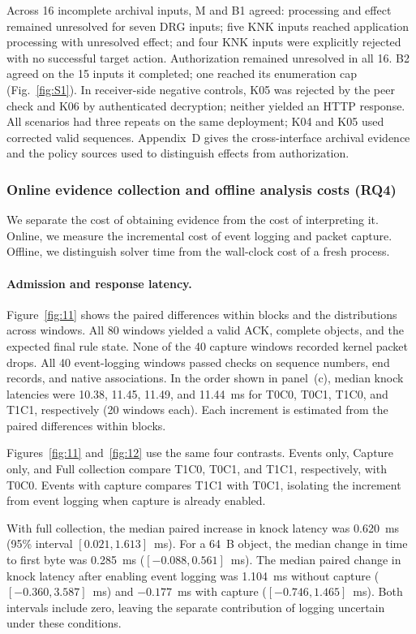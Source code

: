 Across 16 incomplete archival inputs, M and B1 agreed: processing and effect remained unresolved for seven DRG inputs; five KNK inputs reached application processing with unresolved effect; and four KNK inputs were explicitly rejected with no successful target action. Authorization remained unresolved in all 16. B2 agreed on the 15 inputs it completed; one reached its enumeration cap (Fig.~\ref{fig:S1}). In receiver-side negative controls, K05 was rejected by the peer check and K06 by authenticated decryption; neither yielded an HTTP response. All scenarios had three repeats on the same deployment; K04 and K05 used corrected valid sequences. Appendix~D gives the cross-interface archival evidence and the policy sources used to distinguish effects from authorization.

\subsubsection{Online evidence collection and offline analysis costs (RQ4)}\label{sec:cost}
We separate the cost of obtaining evidence from the cost of interpreting it. Online, we measure the incremental cost of event logging and packet capture. Offline, we distinguish solver time from the wall-clock cost of a fresh process.

\paragraph{Admission and response latency.} Figure~\ref{fig:11} shows the paired differences within blocks and the distributions across windows. All 80 windows yielded a valid ACK, complete objects, and the expected final rule state. None of the 40 capture windows recorded kernel packet drops. All 40 event-logging windows passed checks on sequence numbers, end records, and native associations. In the order shown in panel~(c), median knock latencies were 10.38, 11.45, 11.49, and 11.44~ms for T0C0, T0C1, T1C0, and T1C1, respectively (20 windows each). Each increment is estimated from the paired differences within blocks.

Figures~\ref{fig:11} and~\ref{fig:12} use the same four contrasts. Events only, Capture only, and Full collection compare T1C0, T0C1, and T1C1, respectively, with T0C0. Events with capture compares T1C1 with T0C1, isolating the increment from event logging when capture is already enabled.

With full collection, the median paired increase in knock latency was 0.620~ms (95\% interval $[0.021,1.613]$~ms). For a 64~B object, the median change in time to first byte was 0.285~ms ($[-0.088,0.561]$~ms). The median paired change in knock latency after enabling event logging was 1.104~ms without capture ($[-0.360,3.587]$~ms) and $-0.177$~ms with capture ($[-0.746,1.465]$~ms). Both intervals include zero, leaving the separate contribution of logging uncertain under these conditions.

